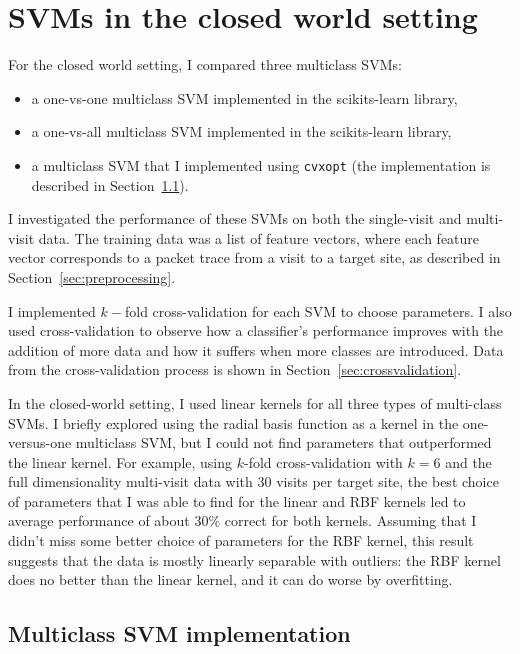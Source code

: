 \documentclass[10pt, twocolumn]{article}
\begin{document}
\section{SVMs in the closed world setting}

For the closed world setting, I compared three multiclass SVMs:
\begin{itemize}
\item a one-vs-one multiclass SVM implemented in the scikits-learn library,
\item a one-vs-all multiclass SVM implemented in the scikits-learn library,
\item a multiclass SVM that I implemented using \texttt{cvxopt} (the implementation is 
described in Section~\ref{sec:multiclassimplementation}).
\end{itemize}

I investigated the performance of these SVMs on both the single-visit and multi-visit data. 
The training data was a list of feature vectors, where each feature vector corresponds to a 
packet trace from a visit to a target site, as described in Section~\ref{sec:preprocessing}.

I implemented $k-$fold cross-validation for each SVM to choose parameters. I also used 
cross-validation to observe how a classifier's performance improves with the addition of more data 
and how it suffers when more classes are introduced. Data from the cross-validation process is shown 
in Section~\ref{sec:crossvalidation}.

In the closed-world setting, I used linear kernels for all three types of multi-class SVMs.
I briefly explored using the radial basis function as a kernel in the one-versus-one multiclass 
SVM, but I could not find parameters that outperformed the linear kernel. For example, using $k$-fold 
cross-validation with $k=6$ and the full dimensionality multi-visit data with 30 visits per target site, the best choice of 
parameters that I was able to find for the linear and RBF kernels led to average performance of about 
$30\%$ correct for both kernels. Assuming that I didn't miss some better choice of parameters for the 
RBF kernel, this result suggests that the data is mostly linearly separable with outliers: the RBF kernel 
does no better than the linear kernel, and it can do worse by overfitting.

\subsection{Multiclass SVM implementation}
\label{sec:multiclassimplementation}
\end{document}
